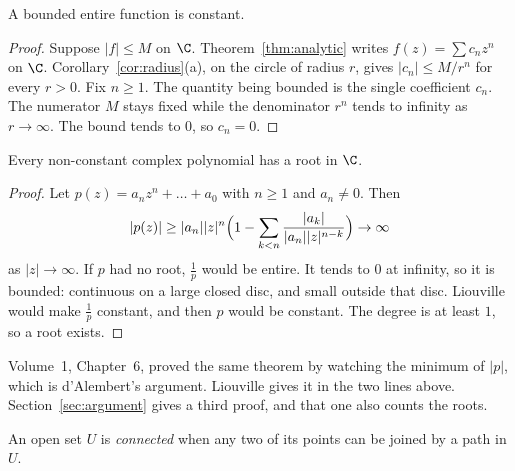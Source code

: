 \begin{theorem}[Liouville]\label{thm:liouville}
A bounded entire function is constant.
\end{theorem}
\begin{proof}
Suppose $|f|\le M$ on $\C$. Theorem~\ref{thm:analytic} writes $f(z)=\sum c_nz^n$ on $\C$. Corollary~\ref{cor:radius}(a), on the circle of radius $r$, gives $|c_n|\le M/r^n$ for every $r>0$. Fix $n\ge1$. The quantity being bounded is the single coefficient $c_n$. The numerator $M$ stays fixed while the denominator $r^n$ tends to infinity as $r\to\infty$. The bound tends to $0$, so $c_n=0$.
\end{proof}

\begin{corollary}\label{cor:fta}
Every non-constant complex polynomial has a root in $\C$.
\end{corollary}
\begin{proof}
Let $p(z)=a_nz^n+\dots+a_0$ with $n\ge1$ and $a_n\ne0$. Then
\[
|p(z)|\ge|a_n||z|^n\Bigl(1-\sum_{k<n}\frac{|a_k|}{|a_n||z|^{n-k}}\Bigr)\to\infty
\]
as $|z|\to\infty$. If $p$ had no root, $\frac1p$ would be entire. It tends to $0$ at infinity, so it is bounded: continuous on a large closed disc, and small outside that disc. Liouville would make $\frac1p$ constant, and then $p$ would be constant. The degree is at least $1$, so a root exists.
\end{proof}

Volume~1, Chapter~6, proved the same theorem by watching the minimum of $|p|$, which is d'Alembert's argument. Liouville gives it in the two lines above. Section~\ref{sec:argument} gives a third proof, and that one also counts the roots.

An open set $U$ is \emph{connected} when any two of its points can be joined by a path in $U$.

